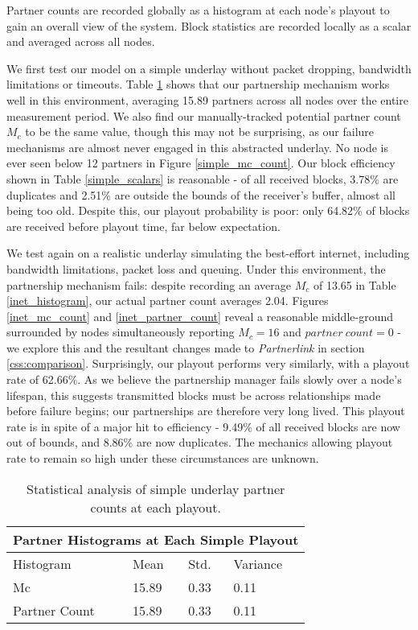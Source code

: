 \documentclass[12pt,a4paper]{article}
\begin{document}
Partner counts are recorded globally as a histogram at each node's playout to gain an overall view of the system. Block statistics are recorded locally as a scalar and averaged across all nodes.

We first test our model on a simple underlay without packet dropping, bandwidth limitations or timeouts. Table \ref{simple_histogram} shows that our partnership mechanism works well in this environment, averaging 15.89 partners across all nodes over the entire measurement period. We also find our manually-tracked potential partner count \(M_c\) to be the same value, though this may not be surprising, as our failure mechanisms are almost never engaged in this abstracted underlay. No node is ever seen below 12 partners in Figure \ref{simple_mc_count}. Our block efficiency shown in Table \ref{simple_scalars} is reasonable - of all received blocks, 3.78\% are duplicates and 2.51\% are outside the bounds of the receiver's buffer, almost all being too old. Despite this, our playout probability is poor: only 64.82\% of blocks are received before playout time, far below expectation.

We test again on a realistic underlay simulating the best-effort internet, including bandwidth limitations, packet loss and queuing. Under this environment, the partnership mechanism fails: despite recording an average \(M_c\) of 13.65 in Table \ref{inet_histogram}, our actual partner count averages 2.04. Figures \ref{inet_mc_count} and \ref{inet_partner_count} reveal a reasonable middle-ground surrounded by nodes simultaneously reporting \(M_c = 16\) and \(partner\ count = 0\) - we explore this and the resultant changes made to \textit{Partnerlink} in section \ref{css:comparison}. Surprisingly, our playout performs very similarly, with a playout rate of 62.66\%. As we believe the partnership manager fails slowly over a node's lifespan, this suggests transmitted blocks must be across relationships made before failure begins; our partnerships are therefore very long lived. This playout rate is in spite of a major hit to efficiency - 9.49\% of all received blocks are now out of bounds, and 8.86\% are now duplicates. The mechanics allowing playout rate to remain so high under these circumstances are unknown.

\begin{table}[h!]
	\centering
	\begin{tabular}{ |p{3cm}||p{3cm}|p{3cm}|p{3cm}|  }
		\hline
		\multicolumn{4}{|c|}{Partner Histograms at Each Simple Playout} \\
		\hline
		Histogram & Mean & Std. & Variance \\
		\hline
		Mc   & 15.89    & 0.33 &   0.11\\
		Partner Count &   15.89  & 0.33   & 0.11\\
		\hline
	\end{tabular} 
	\caption{Statistical analysis of simple underlay partner counts at each playout.}
	\label{simple_histogram}
\end{table}
\end{document}
